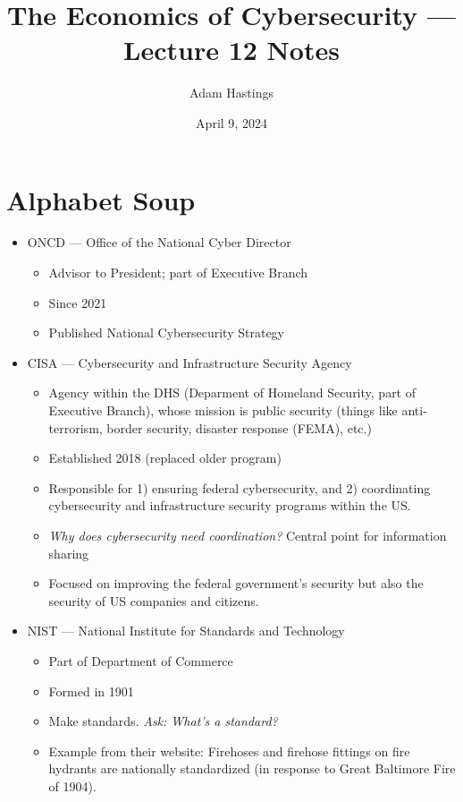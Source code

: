 \documentclass[11pt]{article}
\title{The Economics of Cybersecurity --- Lecture 12 Notes}
\date{April 9, 2024}
\author{Adam Hastings}
\begin{document}
\maketitle

\section{Alphabet Soup}

\begin{itemize}
    \item ONCD --- Office of the National Cyber Director
    \begin{itemize}
        \item Advisor to President; part of Executive Branch
        \item Since 2021
        \item Published National Cybersecurity Strategy
    \end{itemize}
    \item CISA --- Cybersecurity and Infrastructure Security Agency
    \begin{itemize}
        \item Agency within the DHS (Deparment of Homeland Security, part of Executive Branch), whose mission is public security (things like anti-terrorism, border security, disaster response (FEMA), etc.)
        \item Established 2018 (replaced older program)
        \item Responsible for 1) ensuring federal cybersecurity, and 2) coordinating cybersecurity and infrastructure security programs within the US.
        \item {\it Why does cybersecurity need coordination?} Central point for information sharing
        \item Focused on improving the federal government's security but also the security of US companies and citizens. 
    \end{itemize}
    \item NIST --- National Institute for Standards and Technology
    \begin{itemize}
        \item Part of Department of Commerce
        \item Formed in 1901
        \item Make standards. {\it Ask: What's a standard?}
        \item Example from their website: Firehoses and firehose fittings on fire hydrants are nationally standardized (in response to Great Baltimore Fire of 1904).

\end{itemize}
\end{itemize}
\end{document}

